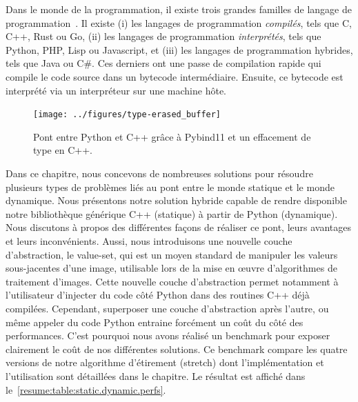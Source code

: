 Dans le monde de la programmation, il existe trois grandes familles de langage de
programmation~\parencite{prechelt.2000.comparison}. Il existe (i) les langages de programmation \emph{compilés}, tels
que C, C++, Rust ou Go, (ii) les langages de programmation \emph{interprétés}, tels que Python, PHP, Lisp ou Javascript,
et (iii) les langages de programmation hybrides, tels que Java ou C\#. Ces derniers ont une passe de compilation rapide
qui compile le code source dans un bytecode intermédiaire. Ensuite, ce bytecode est interprété via un interpréteur sur
une machine hôte.

\begin{figure}[htbp]
  \centering
  \texttt{[image: ../figures/type-erased\_buffer]}
  \caption[]{Pont entre Python et C++ grâce à Pybind11 et un effacement de type en C++.}
  \label{resume:fig:type-erased.buffer}
\end{figure}

Dans ce chapitre, nous concevons de nombreuses solutions pour résoudre plusieurs types de problèmes liés au pont entre
le monde statique et le monde dynamique. Nous présentons notre solution hybride capable de rendre disponible notre
bibliothèque générique C++ (statique) à partir de Python (dynamique). Nous discutons à propos des différentes façons de
réaliser ce pont, leurs avantages et leurs inconvénients. Aussi, nous introduisons une nouvelle couche d'abstraction, le
value-set, qui est un moyen standard de manipuler les valeurs sous-jacentes d'une image, utilisable lors de la mise en
\oe{}uvre d'algorithmes de traitement d'images. Cette nouvelle couche d'abstraction permet notamment à l'utilisateur
d'injecter du code côté Python dans des routines C++ déjà compilées. Cependant, superposer une couche d'abstraction
après l'autre, ou même appeler du code Python entraine forcément un coût du côté des performances. C'est pourquoi nous
avons réalisé un benchmark pour exposer clairement le coût de nos différentes solutions. Ce benchmark compare les quatre
versions de notre algorithme d'étirement (stretch) dont l'implémentation et l'utilisation sont détaillées dans le
chapitre. Le résultat est affiché dans le~\cref{resume:table:static.dynamic.perfs}.

